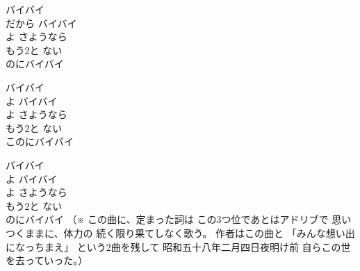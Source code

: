 \documentclass[10pt,b5j]{tarticle} %
\begin{document}
\vspace{1.5em} %
\newcommand{\linespace}{0.5em} %
\newcommand{\blocksize}{0.5\hsize} %
\begin{enumerate} %
    \begin{minipage}[c]{\blocksize}
    
        \vspace{\linespace}
        \item
        バイバイ\\
        だから バイバイ\\
        よ さようなら\\
        もう2と ない\\
        のにバイバイ
        
        \vspace{\linespace}
        \item
        バイバイ\\
        よ バイバイ\\
        よ さようなら\\
        もう2と ない\\
        このにバイバイ
        
        \vspace{\linespace}
        \item
        バイバイ\\
        よ バイバイ\\
        よ さようなら\\
        もう2と ない\\
        のにバイバイ
        （※
        この曲に、定まった詞は
        この3つ位であとはアドリブで
        思いつくままに、体力の
        続く限り果てしなく歌う。
        作者はこの曲と
        「みんな想い出になっちまえ」
        という2曲を残して
        昭和五十八年二月四日夜明け前
        自らこの世を去っていった。）
    
    \end{minipage}
\end{enumerate} %
\end{document}
